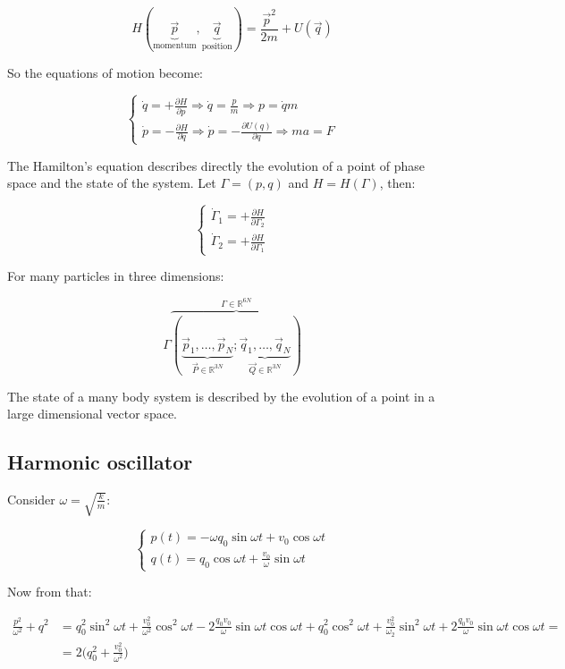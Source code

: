   $$H(\underbrace{\vec{p}}_{\text{momentum}}, \underbrace{\vec{q}}_{\text{position}}) = \frac{\vec{p}^2}{2m} + U(\vec{q})$$

  So the equations of motion become:

  $$\begin{cases}
    \dot{q} = + \frac{\partial {H}}{\partial {p}}\Rightarrow \dot{q} = \frac{p}{m}\Rightarrow p = \dot{q}m\\
    \dot{p} = - \frac{\partial {H}}{\partial {q}}\Rightarrow \dot{p} = -\frac{\partial {U(q)}}{\partial {q}}\Rightarrow ma = F
  \end{cases}$$

  The Hamilton's equation describes directly the evolution of a point of phase space and the state of the system.
  Let $\Gamma = (p,q)$ and $H = H(\Gamma)$, then:

  $$\begin{cases}
    \dot{\Gamma}_1 = +\frac{\partial {H}}{\partial {\Gamma_2}}\\
    \dot{\Gamma}_2 = +\frac{\partial {H}}{\partial {\Gamma_1}}
  \end{cases}$$

  For many particles in three dimensions:

  $$\Gamma\overbrace{(\underbrace{\vec{p}_1,\dots,\vec{p}_N}_{\vec{P}\in \mathbb{R}^{3N}};\underbrace{\vec{q}_1,\dots,\vec{q}_N}_{\vec{Q}\in \mathbb{R}^{3N}})}^{\Gamma\in \mathbb{R}^{6N}}$$

  The state of a many body system is described by the evolution of a point in a large dimensional vector space.

  \subsection{Harmonic oscillator}
  Consider $\omega = \sqrt{\frac{k}{m}}$:

  $$\begin{cases}
    p(t) = -\omega q_0\sin\omega t + v_0\cos\omega t\\
    q(t) = q_0\cos\omega t + \frac{v_0}{\omega}\sin\omega t
  \end{cases}$$

  Now from that:

  \begin{align*}
    \frac{p^2}{\omega^2}+q^2 &= q_0^2\sin^2\omega t + \frac{v_0^2}{\omega^2}\cos^2\omega t - 2 \frac{q_0v_0}{\omega}\sin \omega t\cos \omega t + q_0^2\cos^2\omega t + \frac{v_0^2}{\omega_2}\sin^2\omega t + 2\frac{q_0v_0}{\omega}\sin \omega t\cos \omega t =\\
                             &=2\biggl(q_0^2+\frac{v_0^2}{\omega^2}\biggr)
  \end{align*}

